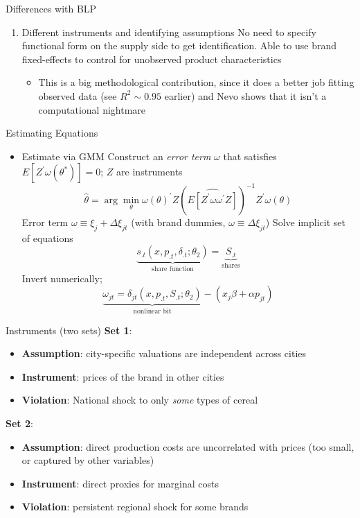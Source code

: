 \documentclass[dvipsnames]{beamer}
\begin{document}
 \begin{frame}{Differences with BLP}
   \begin{enumerate}
   \item Different instruments and identifying assumptions
     \vitem No need to specify functional form on the supply side to get identification.
     \vitem Able to use brand fixed-effects to control for unobserved product characteristics
     \begin{itemize}
     \item This is a big methodological contribution, since it does a better job fitting observed data (see $R^2 \sim 0.95$ earlier) and Nevo shows that it isn't a computational nightmare
     \end{itemize}
   \end{enumerate}
 \end{frame}
 \begin{frame}{Estimating Equations}
   \begin{itemize}
   \item Estimate via GMM
     \vitem Construct an \emph{error term} $\omega$ that satisfies $E[Z^\prime \omega(\theta^\ast)] = 0$; $Z$ are instruments
     \[
\hat{\theta} = \arg \min_\theta \omega(\theta)^\prime Z \left(\widehat{E[Z^\prime \omega \omega^\prime Z]}\right)^{-1} Z^\prime \omega(\theta)
     \]
     \vitem Error term $\omega \equiv \xi_j + \Delta \xi_{jt}$ (with brand dummies, $\omega \equiv \Delta \xi_{jt}$)
     \vitem Solve implicit set of equations
     \[
     \underbrace{s_{.t}(x, p_{.t}, \delta_{.t}; \theta_2)}_{\text{share function}} = \underbrace{S_{.t}}_{\text{shares}}
     \]
     \vitem Invert numerically;
     \[
\underbrace{\omega_{jt} = \delta_{jt}(x, p_{.t}, S_{.t}; \theta_2)}_{\text{nonlinear bit}} - (x_j \beta + \alpha p_{jt})
     \]
   \end{itemize}
 \end{frame}
 \begin{frame}{Instruments (two sets)}
   \textbf{Set 1}:
     \begin{itemize}
     \item \textbf{Assumption}: city-specific valuations are independent across cities
       \item \textbf{Instrument}: prices of the brand in other cities
         \item \textbf{Violation}: National shock to only \emph{some} types of cereal
     \end{itemize}
     \vfill
     \textbf{Set 2}:
     \begin{itemize}
     \item \textbf{Assumption}: direct production costs are uncorrelated with prices (too small, or captured by other variables)
       \item \textbf{Instrument}: direct proxies for marginal costs
         \item \textbf{Violation}: persistent regional shock for some brands
     \end{itemize}
 \end{frame}
\end{document}

